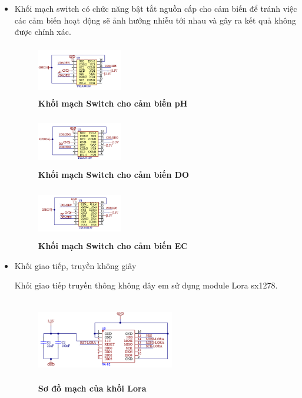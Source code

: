 \documentclass{article} %
\begin{document}
\begin{itemize}
		\newpage
		\item Khối mạch switch có chức năng bật tắt nguồn cấp cho cảm biến để tránh việc các cảm biến hoạt động sẽ ảnh hưởng nhiễu tới nhau và gây ra kết quả không được chính xác.
		\begin{figure}[!ht]
			\centering
			\includegraphics[width=3.7cm,height=2.2cm]{Images/SwitchPh.png}
			\caption[Khối mạch Switch cho cảm biến pH]{\bfseries \fontsize{12pt}{0pt}\selectfont Khối mạch Switch cho cảm biến pH}
			\label{SwitchPh}
		\end{figure}
		
		\begin{figure}[!ht]
			\centering
			\includegraphics[width=3.7cm,height=2.2cm]{Images/SwitchDo.png}
			\caption[Khối mạch Switch cho cảm biến DO]{\bfseries \fontsize{12pt}{0pt}\selectfont Khối mạch Switch cho cảm biến DO}
			\label{SwitchDo}
		\end{figure}
		
		\begin{figure}[!ht]
			\centering
			\includegraphics[width=3.7cm,height=2.2cm]{Images/SwitchEC.png}
			\caption[Khối mạch Switch cho cảm biến EC]{\bfseries \fontsize{12pt}{0pt}\selectfont Khối mạch Switch cho cảm biến EC}
			\label{SwitchEC}
		\end{figure}
		
		\item Khối giao tiếp, truyền không giây

		Khối giao tiếp truyền thông không dây em sử dụng module Lora sx1278.
		\begin{figure}[!ht]
			\centering
			\includegraphics[width=6cm,height=3.6cm]{Images/lora.png}
			\caption[Sơ đồ mạch của khối Lora ]{\bfseries \fontsize{12pt}{0pt}\selectfont Sơ đồ mạch của khối Lora }
			\label{lora}
		\end{figure}
				

\end{itemize}
\end{document}
